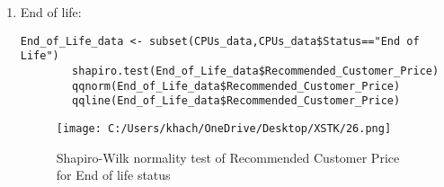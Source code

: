 \documentclass[a4paper]{article}
\begin{document}
\begin{enumerate}
\begin{figure}[htbp]
\begin{adjustbox}{width=0.7\textwidth, frame}
			\end{adjustbox}
			\captionsetup{justification=centering}
			\vspace{0.5cm}
			\caption{Shapiro-Wilk normality test of Recommended Customer Price for End of Interactive Support Status}
		\end{figure}
		\begin{itemize}
			\item Null hypothesis:
			\( H_0 \): The recommended customer price of End of Interactive Support status follows a normal distribution.
			\item Alternative hypothesis:
			\( H_1 \): The recommended customer price of End of Interactive Support status does not follow a normal distribution.
			\item Since the p-value < \(2.2 \times 10^{-16}\) (which is less than the significance level of 5\%), we reject the null hypothesis. Therefore, we conclude that the recommended customer price of mobile devices does not follow a normal distribution.
			\begin{figure}[htbp]
				\centering
				\begin{adjustbox}{width=0.7\textwidth, frame}
					\texttt{[image: C:/Users/khach/OneDrive/Desktop/XSTK/25.png]}
				\end{adjustbox}
				\captionsetup{justification=centering}
				\vspace{0.5cm}
				\caption{Illustration of contribution of Recommended Customer Price for End of Interactive Support status}
			\end{figure}
		\end{itemize}
		\newpage
		\item End of life:
		\begin{lstlisting}[frame=single, backgroundcolor=\color{gray!10}, breaklines=true, columns=fullflexible]
		End_of_Life_data <- subset(CPUs_data,CPUs_data$Status=="End of Life")
		shapiro.test(End_of_Life_data$Recommended_Customer_Price)
		qqnorm(End_of_Life_data$Recommended_Customer_Price)
		qqline(End_of_Life_data$Recommended_Customer_Price)
		\end{lstlisting}
		\begin{figure}[htbp]
			\centering
			\begin{adjustbox}{width=0.7\textwidth, frame}
				\texttt{[image: C:/Users/khach/OneDrive/Desktop/XSTK/26.png]}
			\end{adjustbox}
			\captionsetup{justification=centering}
			\vspace{0.5cm}
			\caption{Shapiro-Wilk normality test of Recommended Customer Price for End of life status}

\end{figure}
\end{enumerate}
\end{document}
